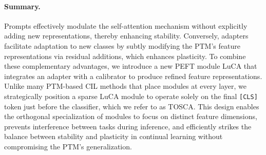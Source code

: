 \paragraph{Summary.} 
Prompts effectively modulate the self-attention mechanism without explicitly adding new representations, thereby enhancing stability. Conversely, adapters facilitate adaptation to new classes by subtly modifying the PTM’s feature representations via residual additions, which enhances plasticity. To combine these complementary advantages, we introduce a new PEFT module LuCA that integrates an adapter with a calibrator to produce refined feature representations. Unlike many PTM-based CIL methods that place modules at every layer, we strategically position a sparse LuCA module to operate solely on the final \texttt{[CLS]} token just before the classifier, which we refer to as TOSCA. This design enables the orthogonal specialization of modules to focus on distinct feature dimensions, prevents interference between tasks during inference, and efficiently strikes the balance between stability and plasticity in continual learning without compromising the PTM’s generalization.